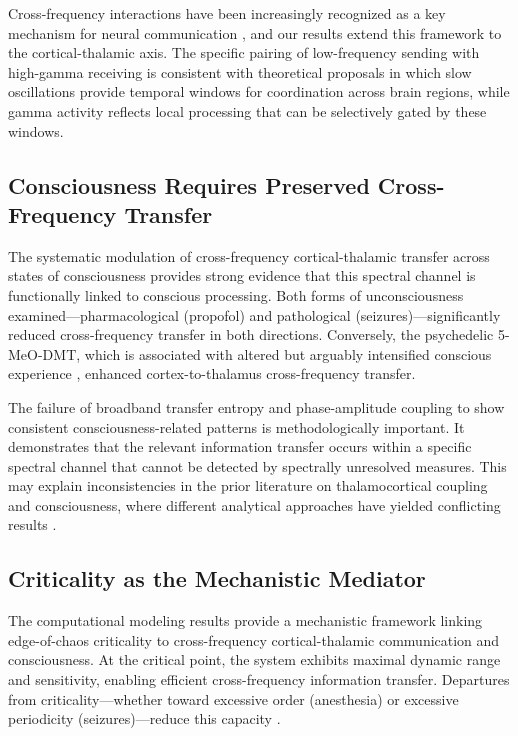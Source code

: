 \documentclass[12pt]{article}
\begin{document}
Cross-frequency interactions have been increasingly recognized as a key mechanism for neural communication \citep{canolty2010role}, and our results extend this framework to the cortical-thalamic axis. The specific pairing of low-frequency sending with high-gamma receiving is consistent with theoretical proposals in which slow oscillations provide temporal windows for coordination across brain regions, while gamma activity reflects local processing that can be selectively gated by these windows.

\subsection{Consciousness Requires Preserved Cross-Frequency Transfer}

The systematic modulation of cross-frequency cortical-thalamic transfer across states of consciousness provides strong evidence that this spectral channel is functionally linked to conscious processing. Both forms of unconsciousness examined---pharmacological (propofol) and pathological (seizures)---significantly reduced cross-frequency transfer in both directions. Conversely, the psychedelic 5-MeO-DMT, which is associated with altered but arguably intensified conscious experience \citep{carhart2016neural}, enhanced cortex-to-thalamus cross-frequency transfer.

The failure of broadband transfer entropy and phase-amplitude coupling to show consistent consciousness-related patterns is methodologically important. It demonstrates that the relevant information transfer occurs within a specific spectral channel that cannot be detected by spectrally unresolved measures. This may explain inconsistencies in the prior literature on thalamocortical coupling and consciousness, where different analytical approaches have yielded conflicting results \citep{purdon2013electroencephalogram}.

\subsection{Criticality as the Mechanistic Mediator}

The computational modeling results provide a mechanistic framework linking edge-of-chaos criticality to cross-frequency cortical-thalamic communication and consciousness. At the critical point, the system exhibits maximal dynamic range and sensitivity, enabling efficient cross-frequency information transfer. Departures from criticality---whether toward excessive order (anesthesia) or excessive periodicity (seizures)---reduce this capacity \citep{shew2013functional, tagliazucchi2016large}.
\end{document}
